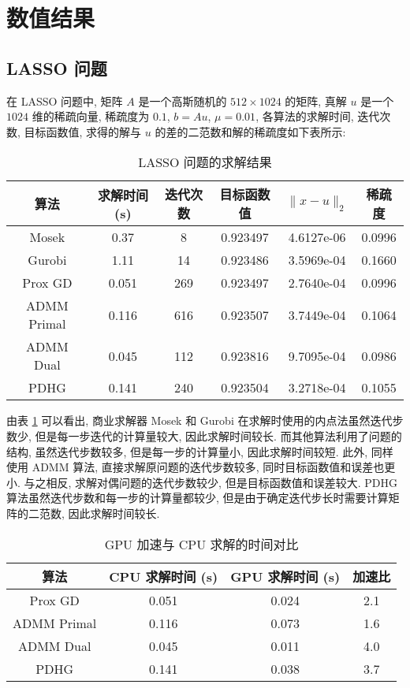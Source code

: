 \documentclass{article}
\begin{document}
\section{数值结果}

\subsection{LASSO 问题}

在 LASSO 问题中, 矩阵 $A$ 是一个高斯随机的 $512\times 1024$ 的矩阵, 真解 $u$ 是一个 $1024$ 维的稀疏向量, 稀疏度为 $0.1$, $b=Au$, $\mu=0.01$, 各算法的求解时间, 迭代次数, 目标函数值, 求得的解与 $u$ 的差的二范数和解的稀疏度如下表所示:
\begin{table}[h]
    \centering
    \begin{tabular}{cccccc}
        \toprule
        算法 & 求解时间 (s) & 迭代次数 & 目标函数值 & $\|x - u\|_2$ & 稀疏度\\
        \midrule
        Mosek & 0.37 & 8 & 0.923497 & 4.6127e-06 & 0.0996 \\
        Gurobi & 1.11 & 14 & 0.923486 & 3.5969e-04 & 0.1660 \\
        Prox GD & 0.051 & 269 & 0.923497 & 2.7640e-04 & 0.0996 \\
        ADMM Primal & 0.116 & 616 & 0.923507 & 3.7449e-04 & 0.1064 \\
        ADMM Dual & 0.045 & 112 & 0.923816 & 9.7095e-04 & 0.0986 \\
        PDHG & 0.141 & 240 & 0.923504 & 3.2718e-04 & 0.1055 \\
        \bottomrule
    \end{tabular}
    \caption{LASSO 问题的求解结果}
    \label{tab:lasso}
\end{table}

由表 \ref{tab:lasso} 可以看出, 商业求解器 Mosek 和 Gurobi 在求解时使用的内点法虽然迭代步数少, 但是每一步迭代的计算量较大, 因此求解时间较长. 而其他算法利用了问题的结构, 虽然迭代步数较多, 但是每一步的计算量小, 因此求解时间较短. 此外, 同样使用 ADMM 算法, 直接求解原问题的迭代步数较多, 同时目标函数值和误差也更小. 与之相反, 求解对偶问题的迭代步数较少, 但是目标函数值和误差较大. PDHG 算法虽然迭代步数和每一步的计算量都较少, 但是由于确定迭代步长时需要计算矩阵的二范数, 因此求解时间较长.

\begin{table}[h]
    \centering
    \begin{tabular}{cccc}
        \toprule
        算法 & CPU 求解时间 (s) & GPU 求解时间 (s) & 加速比 \\
        \midrule
        Prox GD & 0.051 & 0.024 & 2.1 \\
        ADMM Primal & 0.116 & 0.073 & 1.6 \\
        ADMM Dual & 0.045 & 0.011 & 4.0 \\
        PDHG & 0.141 & 0.038 & 3.7 \\
        \bottomrule
    \end{tabular}
    \caption{GPU 加速与 CPU 求解的时间对比}
    \label{tab:gpu_cpu_comparison}
\end{table}
\end{document}
